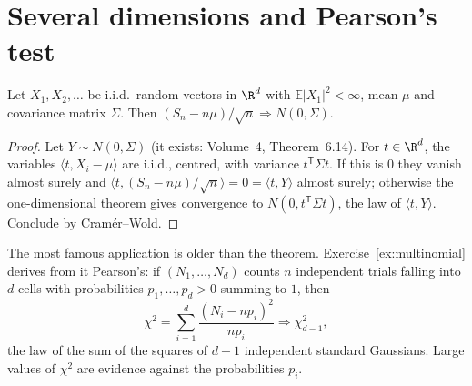 \section{Several dimensions and Pearson's test}

\begin{theorem}\label{thm:multiclt}
Let $X_1,X_2,\dots$ be i.i.d.\ random vectors in $\R^d$ with $\mathbb E|X_1|^2<\infty$, mean $\mu$ and covariance matrix $\Sigma$. Then
$(S_n-n\mu)/\sqrt n\Rightarrow N(0,\Sigma)$.
\end{theorem}
\begin{proof}
Let $Y\sim N(0,\Sigma)$ (it exists: Volume~4, Theorem~6.14). For $t\in\R^d$, the variables $\langle t,X_i-\mu\rangle$ are i.i.d., centred, with variance
$t^{\mathsf T}\Sigma t$. If this is $0$ they vanish almost surely and $\langle t,(S_n-n\mu)/\sqrt n\rangle=0=\langle t,Y\rangle$ almost surely; otherwise the
one-dimensional theorem gives convergence to $N(0,t^{\mathsf T}\Sigma t)$, the law of $\langle t,Y\rangle$. Conclude by Cram\'er--Wold.
\end{proof}

The most famous application is older than the theorem. Exercise~\ref{ex:multinomial} derives from it Pearson's: if $(N_1,\dots,N_d)$ counts $n$
independent trials falling into $d$ cells with probabilities $p_1,\dots,p_d>0$ summing to $1$, then
\[
\chi^2=\sum_{i=1}^d\frac{(N_i-np_i)^2}{np_i}\Rightarrow\chi^2_{d-1},
\]
the law of the sum of the squares of $d-1$ independent standard Gaussians. Large values of $\chi^2$ are evidence against the probabilities $p_i$.

